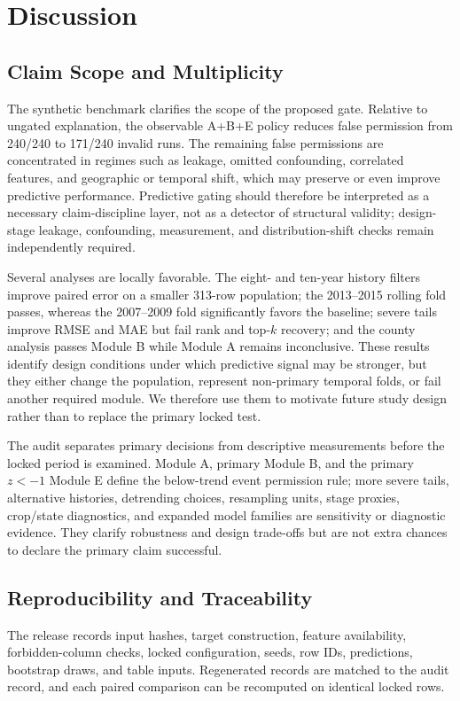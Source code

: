\documentclass[conference]{IEEEtran}
\begin{document}
\section{Discussion}
\subsection{Claim Scope and Multiplicity}
The synthetic benchmark clarifies the scope of the proposed gate. Relative to
ungated explanation, the observable A+B+E policy reduces false permission from
240/240 to 171/240 invalid runs. The remaining false permissions are concentrated
in regimes such as leakage, omitted confounding, correlated features, and
geographic or temporal shift, which may preserve or even improve predictive
performance. Predictive gating should therefore be interpreted as a necessary
claim-discipline layer, not as a detector of structural validity; design-stage
leakage, confounding, measurement, and distribution-shift checks remain
independently required.

Several analyses are locally favorable. The eight- and ten-year history filters
improve paired error on a smaller 313-row population; the 2013--2015 rolling fold
passes, whereas the 2007--2009 fold significantly favors the baseline; severe
tails improve RMSE and MAE but fail rank and top-$k$ recovery; and the county
analysis passes Module B while Module A remains inconclusive. These results
identify design conditions under which predictive signal may be stronger, but
they either change the population, represent non-primary temporal folds, or fail
another required module. We therefore use them to motivate future study design
rather than to replace the primary locked test.

The audit separates primary decisions from descriptive measurements before the
locked period is examined. Module A, primary Module B, and the primary $z<-1$
Module E define the below-trend event permission rule; more severe tails,
alternative histories, detrending choices, resampling units, stage proxies,
crop/state diagnostics, and expanded model families are sensitivity or diagnostic
evidence. They clarify robustness and design trade-offs but are not extra chances
to declare the primary claim successful.

\subsection{Reproducibility and Traceability}
The release records input hashes, target construction, feature availability,
forbidden-column checks, locked configuration, seeds, row IDs, predictions,
bootstrap draws, and table inputs. Regenerated records are matched to the audit
record, and each paired comparison can be recomputed on identical locked rows.
\end{document}
